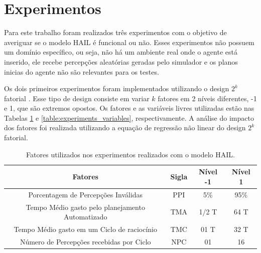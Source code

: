 \section{Experimentos}

Para este trabalho foram realizados três experimentos com o objetivo de averiguar se o modelo HAIL é funcional ou não. Esses experimentos não possuem um domínio específico, ou seja, não há um ambiente real onde o agente está inserido, ele recebe percepções aleatórias geradas pelo simulador e os planos inicias do agente não são relevantes para os testes.

Os dois primeiros experimentos foram implementados utilizando o design $2^k$ fatorial \cite{jain1990art}. Esse tipo de design consiste em variar $k$ fatores em 2 níveis diferentes, -1 e 1, que são extremos opostos. Os fatores e as variáveis livres utilizadas estão nas Tabelas \ref{table:experiments_factors} e \ref{table:experiments_variables}, respectivamente. A análise do impacto dos fatores foi realizada utilizando a equação de regressão não linear do design $2^k$ fatorial.

\begin{table}[h!]
    \begin{center}
        \caption{ Fatores utilizados nos experimentos realizados com o modelo HAIL. }
        \label{table:experiments_factors}
        \begin{tabular}{|c|c|c|c|}
        \hline
        \textbf{Fatores} & \textbf{Sigla} & \textbf{Nível -1} & \textbf{Nível 1} \\
        \hline
        Porcentagem de Percepções Inválidas & PPI & 5\% & 95\%  \\
        \hline
        Tempo Médio gasto pelo planejamento Automatizado & TMA & 1/2 T & 64 T \\
        \hline
        Tempo Médio gasto em um Ciclo de raciocínio & TMC & 01 T & 32 T \\
        \hline
        Número de Percepções recebidas por Ciclo & NPC & 01 & 16 \\
        \hline
    \end{tabular}{}
    \end{center}
\end{table}{}

